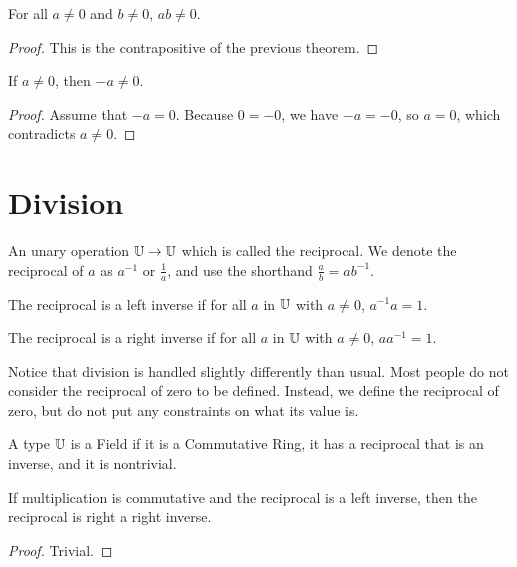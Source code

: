 \documentclass[../../math.tex]{subfiles}
\begin{document}
\begin{theorem} \label{mult_nz}
    For all $a \neq 0$ and $b \neq 0$, $ab \neq 0$.
\end{theorem}
\begin{proof}
    This is the contrapositive of the previous theorem.
\end{proof}

\begin{theorem}
    If $a \neq 0$, then $-a \neq 0$.
\end{theorem}
\begin{proof}
    Assume that $-a = 0$.  Because $0 = -0$, we have $-a = -0$, so $a = 0$,
    which contradicts $a \neq 0$.
\end{proof}

\section{Division}

\begin{class}
    An unary operation $\mathbb{U} \rightarrow \mathbb{U}$ which is called the reciprocal.  We
    denote the reciprocal of $a$ as $a^{-1}$ or $\frac{1}{a}$, and use the
    shorthand $\frac{a}{b} = a b^{-1}$.
\end{class}

\begin{class}
    The reciprocal is a left inverse if for all $a$ in $\mathbb{U}$ with $a \neq 0$,
    $a^{-1}a = 1$.
\end{class}

\begin{class}
    The reciprocal is a right inverse if for all $a$ in $\mathbb{U}$ with $a \neq 0$,
    $aa^{-1} = 1$.
\end{class}

Notice that division is handled slightly differently than usual.  Most people do
not consider the reciprocal of zero to be defined.  Instead, we define the
reciprocal of zero, but do not put any constraints on what its value is.

\begin{class}[Field]
    A type $\mathbb{U}$ is a Field if it is a Commutative Ring, it has a reciprocal that
    is an inverse, and it is nontrivial.
\end{class}

\begin{instance}
    If multiplication is commutative and the reciprocal is a left inverse, then
    the reciprocal is right a right inverse.
\end{instance}
\begin{proof}
    Trivial.
\end{proof}
\end{document}
